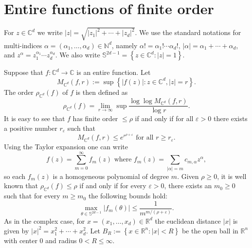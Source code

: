 \documentclass[12pt]{amsart}
\begin{document}
\section{Entire functions of finite order}


For $z \in\mathbb{C}^{d}$ we write $\left\vert z\right\vert =\sqrt{\left\vert
	z_{1}\right\vert ^{2}+ \cdots+\left\vert z_{d}\right\vert ^{2}}.$  We use the standard notations for multi-indices $\alpha=\left(
\alpha_{1}, \dots,\alpha_{d}\right)  \in\mathbb{N}^{d}$, namely $\alpha
!=\alpha_{1}! \cdots\alpha_{d}!$, $\left\vert \alpha\right\vert =\alpha
_{1}+\cdots+\alpha_{d}$, and $z^{\alpha}= z_{1}^{\alpha_{1}} \cdots
z_{d}^{\alpha_{d}}.$ We also write $\mathbb{S} ^{2d-1}=\left\{  z\in
\mathbb{C}^{d}:\left\vert z\right\vert =1\right\}  .$

Suppose that $f:\mathbb{C} ^{d}\rightarrow\mathbb{C}$ is an entire function.
Let
\begin{equation}
	M_{\mathbb{C}^{d}}\left(  f,r\right)  :=\sup\left\{  \left\vert f\left(
	z\right)  \right\vert :z\in\mathbb{C}^{d},\left\vert z\right\vert =r\right\}
	.
\end{equation}
The order $\rho_{\mathbb{C}^{d}}\left(  f\right)  $ of $f$ is then defined as
\[
\rho_{\mathbb{C}^{d}}\left(  f\right)  =\lim_{r\rightarrow\infty}\sup\frac{
	\log\log M_{\mathbb{C}^{d}}\left(  f,r\right)  }{\log r}.
\]
It is easy to see that $f$ has finite order $\leq\rho$ if and only if for all
$\varepsilon>0$ there exists a positive number $r_{\varepsilon}$ such that
\[
M_{\mathbb{C}^{d}}\left(  f,r\right)  \leq e^{r^{\rho+\varepsilon}}\text{ for
	all }r\geq r_{\varepsilon}.
\]
Using the Taylor expansion one can write
\[
f\left(  z\right)  =\sum_{m=0}^{\infty}f_{m}\left(  z\right)  \text{ where }
f_{m}\left(  z\right)  =\sum_{\left\vert \alpha\right\vert =m}c_{m,\alpha
}z^{\alpha},
\]
so each $f_{m}\left(  z\right)  $ is a homogeneous polynomial of degree $m$.
Given $\rho\ge0$, it is well known that $\rho_{ \mathbb{C}^{d}}\left(
f\right)  \leq\rho$ if and only if for every $\varepsilon>0$, there exists an
$m_{0} \geq0$ such that for every $m \ge m_{0}$ the following bounds hold:
\begin{equation}
	\max_{\theta\in\mathbb{S}^{2 d-1}}\left\vert f_{m}\left(  \theta\right)
	\right\vert \leq\frac{1}{m^{m/\left(  \rho+\varepsilon\right)  }}.
	\label{eqtaylor}%
\end{equation}
As in the complex case, for $x=\left(  x_{1},\dots,x_{d}\right)  \in
\mathbb{R}^{d}$ the euclidean distance $\left\vert x\right\vert $ is given by
$\left\vert x\right\vert ^{2}=x_{1}^{2}+\cdots+x_{d}^{2}$. Let $B_{R}%
:=\left\{  x\in\mathbb{ R}^{n}:\left\vert x\right\vert <R\right\}  $ be the
open ball in $\mathbb{R}^{n}$ with center $0$ and radius $0<R\leq\infty.$
\end{document}
